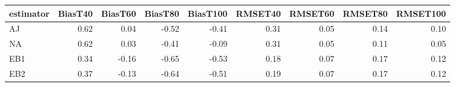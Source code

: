 \begin{table}[ht]
\centering
\begin{tabular}{lrrrrrrrr}
  \toprule
estimator & BiasT40 & BiasT60 & BiasT80 & BiasT100 & RMSET40 & RMSET60 & RMSET80 & RMSET100 \\ 
  \midrule
AJ & 0.62 & 0.04 & -0.52 & -0.41 & 0.31 & 0.05 & 0.14 & 0.10 \\ 
  NA & 0.62 & 0.03 & -0.41 & -0.09 & 0.31 & 0.05 & 0.11 & 0.05 \\ 
  EB1 & 0.34 & -0.16 & -0.65 & -0.53 & 0.18 & 0.07 & 0.17 & 0.12 \\ 
  EB2 & 0.37 & -0.13 & -0.64 & -0.51 & 0.19 & 0.07 & 0.17 & 0.12 \\ 
   \bottomrule
\end{tabular}
\end{table}
